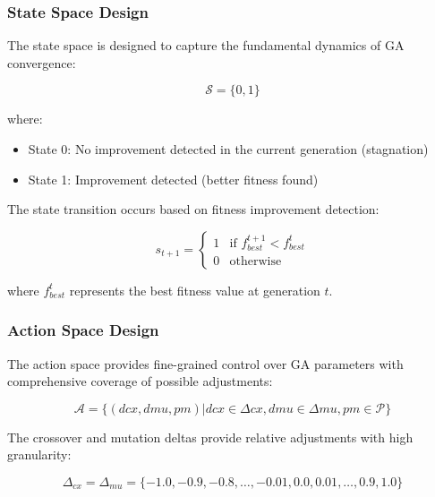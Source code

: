 \documentclass[12pt,a4paper]{article}
\begin{document}
\subsubsection{State Space Design}

The state space is designed to capture the fundamental dynamics of GA convergence:

\begin{equation}\label{Eq.rl_state_space}
\mathcal{S} = \{0, 1\}
\end{equation}

where:
\begin{itemize}
\item State 0: No improvement detected in the current generation (stagnation)
\item State 1: Improvement detected (better fitness found)
\end{itemize}

The state transition occurs based on fitness improvement detection:

\begin{equation}\label{Eq.state_transition}
s_{t+1} = \begin{cases}
1 & \text{if } f_{best}^{t+1} < f_{best}^t \\
0 & \text{otherwise}
\end{cases}
\end{equation}

where $f_{best}^t$ represents the best fitness value at generation $t$.

\subsubsection{Action Space Design}

The action space provides fine-grained control over GA parameters with comprehensive coverage of possible adjustments:

\begin{equation}\label{Eq.rl_actions}
\mathcal{A} = \{(dcx, dmu, pm) | dcx \in \Delta cx, dmu \in \Delta mu, pm \in \mathcal{P}\}
\end{equation}

The crossover and mutation deltas provide relative adjustments with high granularity:

\begin{equation}\label{Eq.delta_sets}
\Delta_{cx} = \Delta_{mu} = \{-1.0, -0.9, -0.8, \ldots, -0.01, 0.0, 0.01, \ldots, 0.9, 1.0\}
\end{equation}
\end{document}
